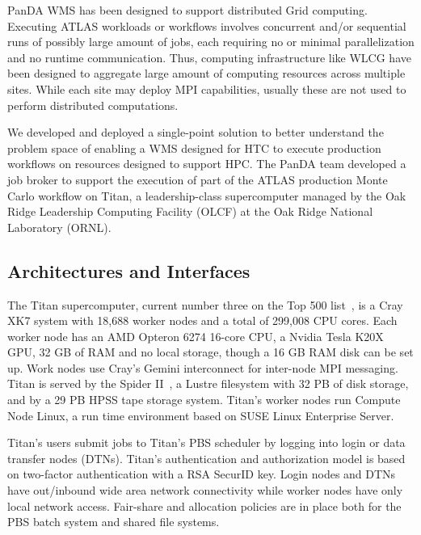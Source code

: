 \documentclass[conference]{IEEEtran}
\begin{document}
PanDA WMS has been designed to support distributed Grid computing. Executing
ATLAS workloads or workflows involves concurrent and/or sequential runs of
possibly large amount of jobs, each requiring no or minimal parallelization and
no runtime communication. Thus, computing infrastructure like WLCG have been
designed to aggregate large amount of computing resources across multiple sites.
While each site may deploy MPI capabilities, usually these are not used to
perform distributed computations.

We developed and deployed a single-point solution to better understand the
problem space of enabling a WMS designed for HTC to execute production workflows
on resources designed to support HPC. The PanDA team developed a job broker to
support the execution of part of the ATLAS production Monte Carlo workflow on
Titan, a leadership-class supercomputer managed by the Oak Ridge Leadership
Computing Facility (OLCF) at the Oak Ridge National Laboratory (ORNL).


\subsection{Architectures and Interfaces}
\label{ssec:panda-titan}

The Titan supercomputer, current number three on the Top 500 list~\cite{top500},
is a Cray XK7 system with 18,688 worker nodes and a total of 299,008 CPU cores.
Each worker node has an AMD Opteron  6274 16-core CPU, a Nvidia Tesla K20X GPU,
32 GB of RAM and no local storage, though a 16 GB RAM disk can be set up. Work
nodes use Cray’s Gemini interconnect for inter-node MPI messaging. Titan is
served by the Spider II~\cite{oral2013olcf}, a Lustre filesystem with 32 PB of
disk storage, and by a 29 PB HPSS tape storage system. Titan’s worker nodes run
Compute Node Linux, a run time environment based on SUSE Linux Enterprise
Server.

Titan's users submit jobs to Titan's PBS scheduler by logging into login or data
transfer nodes (DTNs). Titan's authentication and authorization model is based
on two-factor authentication with a RSA SecurID key. Login nodes and DTNs have
out/inbound wide area network connectivity while worker nodes have only local
network access. Fair-share and allocation policies are in place both for the PBS
batch system and shared file systems.
\end{document}
